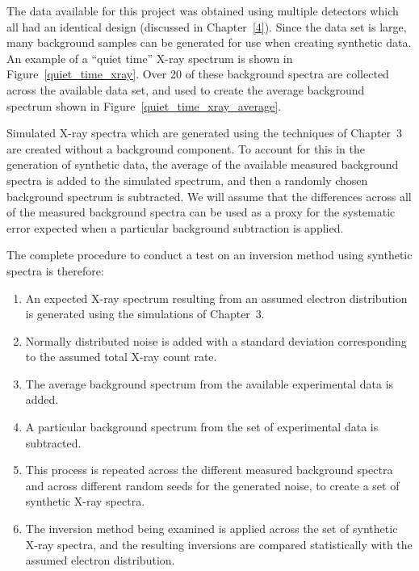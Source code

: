 The data available for this project was obtained using multiple detectors which all had an identical design (discussed in Chapter~\ref{4}). Since the data set is large, many background samples can be generated for use when creating synthetic data. An example of a ``quiet time'' X-ray spectrum is shown in Figure~\ref{quiet_time_xray}. Over 20 of these background spectra are collected across the available data set, and used to create the average background spectrum shown in Figure~\ref{quiet_time_xray_average}.

Simulated X-ray spectra which are generated using the techniques of Chapter~3 are created without a background component. To account for this in the generation of synthetic data, the average of the available measured background spectra is added to the simulated spectrum, and then a randomly chosen background spectrum is subtracted. We will assume that the differences across all of the measured background spectra can be used as a proxy for the systematic error
expected when a particular background subtraction is applied. 

The complete procedure to conduct a test on an inversion method using synthetic spectra is therefore: 

\begin{enumerate}
    \item An expected X-ray spectrum resulting from an assumed electron distribution is generated using the simulations of Chapter~3. 
    \item Normally distributed noise is added with a standard deviation corresponding to the assumed total X-ray count rate.
    \item The average background spectrum from the available experimental data is added.
    \item A particular background spectrum from the set of experimental data is subtracted.
    \item This process is repeated across the different measured background spectra and across different random seeds for the generated noise, to create a set of synthetic X-ray spectra.
    \item The inversion method being examined is applied across the set of synthetic X-ray spectra, and the resulting inversions are compared statistically with the assumed electron distribution. 
\end{enumerate}

